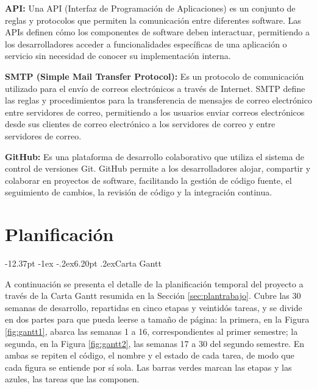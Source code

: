 \documentclass[12pt,letterpaper,oneside]{report}
\makeatletter
\renewcommand\section{\@startsection{section}{1}{\z@}%
  {-12.37pt \@plus -1ex \@minus -.2ex}{6.20pt \@plus.2ex}{\normalfont\large\bfseries}}
\makeatother
\begin{document}
\begin{description}
  \item \textbf{API:} Una API (Interfaz de Programación de Aplicaciones) es un conjunto de reglas y protocolos que permiten la comunicación entre diferentes software. Las APIs definen cómo los componentes de software deben interactuar, permitiendo a los desarrolladores acceder a funcionalidades específicas de una aplicación o servicio sin necesidad de conocer su implementación interna.

  \item \textbf{SMTP (Simple Mail Transfer Protocol):} Es un protocolo de comunicación utilizado para el envío de correos electrónicos a través de Internet. SMTP define las reglas y procedimientos para la transferencia de mensajes de correo electrónico entre servidores de correo, permitiendo a los usuarios enviar correos electrónicos desde sus clientes de correo electrónico a los servidores de correo y entre servidores de correo.

  \item \textbf{GitHub:} Es una plataforma de desarrollo colaborativo que utiliza el sistema de control de versiones Git. GitHub permite a los desarrolladores alojar, compartir y colaborar en proyectos de software, facilitando la gestión de código fuente, el seguimiento de cambios, la revisión de código y la integración continua.
\end{description}

\printbibliography[heading=bibintoc]

\appendix
\renewcommand{\appendixname}{Anexo}
\chapter{Planificación}

\section{Carta Gantt}
\label{anx:gantt}

A continuación se presenta el detalle de la planificación temporal del proyecto a través de la Carta Gantt resumida en la Sección \ref{sec:plantrabajo}. Cubre las 30 semanas de desarrollo, repartidas en cinco etapas y veintidós tareas, y se divide en dos partes para que pueda leerse a tamaño de página: la primera, en la Figura \ref{fig:gantt1}, abarca las semanas 1 a 16, correspondientes al primer semestre; la segunda, en la Figura \ref{fig:gantt2}, las semanas 17 a 30 del segundo semestre. En ambas se repiten el código, el nombre y el estado de cada tarea, de modo que cada figura se entiende por sí sola. Las barras verdes marcan las etapas y las azules, las tareas que las componen.
\end{document}
